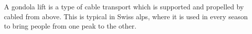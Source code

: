 A gondola lift is a type of cable transport which is supported and propelled by cabled from above.
This is typical in Swiss alps, where it is used in every season to bring people from one peak to the other.

